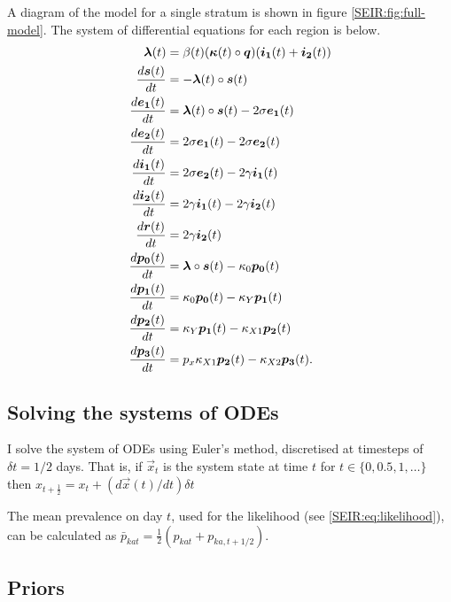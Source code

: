 \documentclass[thesis.tex]{subfiles}
\begin{document}
A diagram of the model for a single stratum is shown in figure \cref{SEIR:fig:full-model}.
The system of differential equations for each region is below.
\begin{align}
    \label{SEIR:eq:fullODEs}
    \bm{\lambda}(t) &= \beta(t) (\bm{\kappa}(t) \circ \bm{q}) (\bm{i_1}(t) + \bm{i_2}(t)) \\
    \frac{d\bm{s}(t)}{dt} &= -\bm{\lambda}(t) \circ \bm{s}(t) \\
    \frac{d\bm{e_1}(t)}{dt} &= \bm{\lambda}(t) \circ \bm{s}(t) - 2\sigma \bm{e_1}(t) \\
    \frac{d\bm{e_2}(t)}{dt} &= 2\sigma \bm{e_1}(t) - 2\sigma \bm{e_2}(t) \\
    \frac{d\bm{i_1}(t)}{dt} &= 2\sigma \bm{e_2}(t) - 2\gamma \bm{i_1}(t) \\
    \frac{d\bm{i_2}(t)}{dt} &= 2\gamma \bm{i_1}(t) - 2\gamma \bm{i_2}(t) \\
    \frac{d\bm{r}(t)}{dt} &= 2\gamma \bm{i_2}(t) \\
    \frac{d\bm{p_0}(t)}{dt} &= \bm{\lambda} \circ \bm{s}(t) - \kappa_0 \bm{p_0}(t) \\
    \frac{d\bm{p_1}(t)}{dt} &= \kappa_0 \bm{p_0}(t) - \kappa_Y \bm{p_1}(t) \\
    \frac{d\bm{p_2}(t)}{dt} &= \kappa_Y \bm{p_1}(t) - \kappa_{X1} \bm{p_2}(t) \\
    \frac{d\bm{p_3}(t)}{dt} &= p_x \kappa_{X1} \bm{p_2}(t) - \kappa_{X2} \bm{p_3}(t).
\end{align}

\subsection{Solving the systems of ODEs} \label{SEIR:sec:solving-ODEs}
I solve the system of ODEs using Euler's method, discretised at timesteps of $\delta t = 1/2$ days.
That is, if $\vec{x}_t$ is the system state at time $t$ for $t \in \{ 0, 0.5, 1, \dots \}$ then $x_{t+\frac{1}{2}} = x_t + (d\vec{x}(t)/dt) \delta t$

The mean prevalence on day $t$, used for the likelihood (see \cref{SEIR:eq:likelihood}), can be calculated as $\bar{p}_{kat} = \frac{1}{2} ( p_{kat} + p_{ka,t+1/2} )$.

\subsection{Priors} \label{SEIR:sec:priors}
\end{document}
